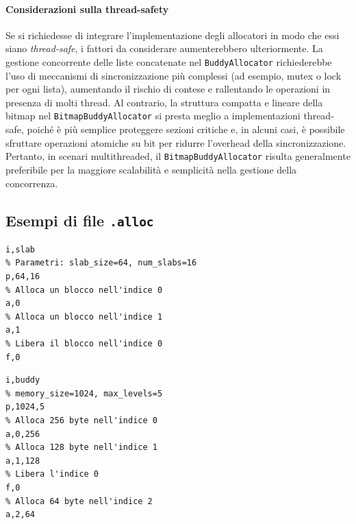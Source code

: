 \paragraph{Considerazioni sulla thread-safety}
Se si richiedesse di integrare l'implementazione degli allocatori in modo che essi siano \textit{thread-safe}, i fattori da considerare aumenterebbero ulteriormente. La gestione concorrente delle liste concatenate nel \texttt{BuddyAllocator} richiederebbe l'uso di meccanismi di sincronizzazione più complessi (ad esempio, mutex o lock per ogni lista), aumentando il rischio di contese e rallentando le operazioni in presenza di molti thread. Al contrario, la struttura compatta e lineare della bitmap nel \texttt{BitmapBuddyAllocator} si presta meglio a implementazioni thread-safe, poiché è più semplice proteggere sezioni critiche e, in alcuni casi, è possibile sfruttare operazioni atomiche su bit per ridurre l'overhead della sincronizzazione. Pertanto, in scenari multithreaded, il \texttt{BitmapBuddyAllocator} risulta generalmente preferibile per la maggiore scalabilità e semplicità nella gestione della concorrenza.

\pagebreak

\subsection{Esempi di file \texttt{.alloc}}
\begin{lstlisting}[language={}]
% Tipo di allocatore (Slab)
i,slab         
% Parametri: slab_size=64, num_slabs=16
p,64,16        
% Alloca un blocco nell'indice 0
a,0            
% Alloca un blocco nell'indice 1
a,1            
% Libera il blocco nell'indice 0
f,0      
\end{lstlisting}      
\begin{lstlisting}[language={}]
% Benchmark per allocatore variabile
i,buddy
% memory_size=1024, max_levels=5
p,1024,5       
% Alloca 256 byte nell'indice 0
a,0,256        
% Alloca 128 byte nell'indice 1
a,1,128        
% Libera l'indice 0
f,0            
% Alloca 64 byte nell'indice 2
a,2,64         
\end{lstlisting}
\pagebreak




